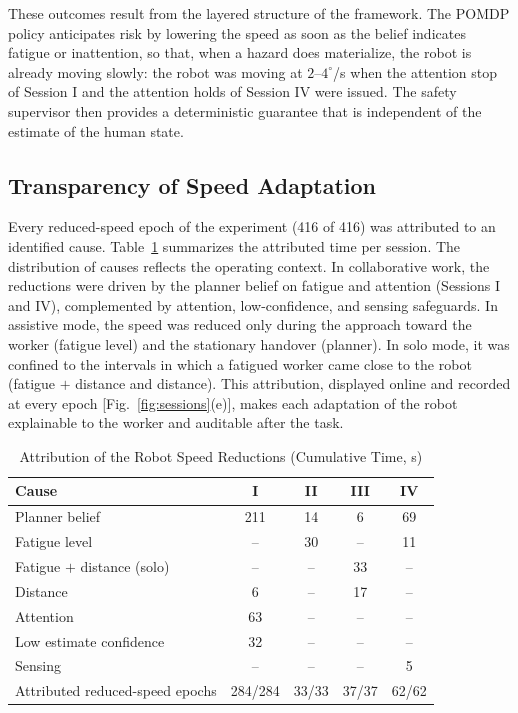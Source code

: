These outcomes result from the layered structure of the framework. The POMDP policy anticipates risk by
lowering the speed as soon as the belief indicates fatigue or inattention, so that, when a hazard does
materialize, the robot is already moving slowly: the robot was moving at $2$--$4^\circ$/s when the attention
stop of Session I and the attention holds of Session IV were issued. The safety supervisor then provides a
deterministic guarantee that is independent of the estimate of the human state.

\subsection{Transparency of Speed Adaptation}
\label{sec:transparency}

Every reduced-speed epoch of the experiment (416 of 416) was attributed to an identified cause.
Table~\ref{tab:causes} summarizes the attributed time per session. The distribution of causes reflects the
operating context. In collaborative work, the reductions were driven by the planner belief on fatigue and
attention (Sessions I and IV), complemented by attention, low-confidence, and sensing safeguards. In
assistive mode, the speed was reduced only during the approach toward the worker (fatigue level) and the
stationary handover (planner). In solo mode, it was confined to
the intervals in which a fatigued worker came close to the robot (fatigue $+$ distance and distance). This
attribution, displayed online and recorded at every epoch [Fig.~\ref{fig:sessions}(e)], makes each adaptation
of the robot explainable to the worker and auditable after the task.

\begin{table}[!t]
\centering
\caption{Attribution of the Robot Speed Reductions (Cumulative Time, s)}
\label{tab:causes}
\setlength{\tabcolsep}{5pt}
\renewcommand{\arraystretch}{1.08}
\begin{tabular}{@{}lcccc@{}}
\toprule
\textbf{Cause} & \textbf{I} & \textbf{II} & \textbf{III} & \textbf{IV} \\
\midrule
Planner belief & 211 & 14 & 6 & 69 \\
Fatigue level & -- & 30 & -- & 11 \\
Fatigue $+$ distance (solo) & -- & -- & 33 & -- \\
Distance & 6 & -- & 17 & -- \\
Attention & 63 & -- & -- & -- \\
Low estimate confidence & 32 & -- & -- & -- \\
Sensing & -- & -- & -- & 5 \\
\midrule
Attributed reduced-speed epochs & 284/284 & 33/33 & 37/37 & 62/62 \\
\bottomrule
\end{tabular}
\end{table}

